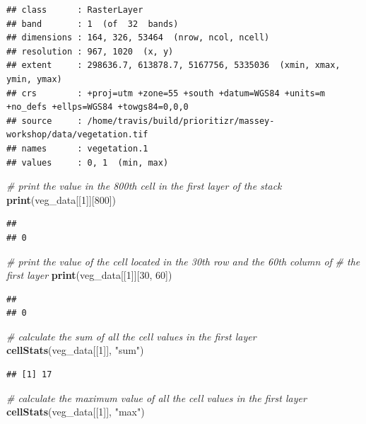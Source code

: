 \documentclass[12pt,]{book}
\newenvironment{Shaded}{\begin{snugshade}}{\end{snugshade}}
\newcommand{\KeywordTok}[1]{\textcolor[rgb]{0.13,0.29,0.53}{\textbf{#1}}}
\newcommand{\DecValTok}[1]{\textcolor[rgb]{0.00,0.00,0.81}{#1}}
\newcommand{\StringTok}[1]{\textcolor[rgb]{0.31,0.60,0.02}{#1}}
\newcommand{\CommentTok}[1]{\textcolor[rgb]{0.56,0.35,0.01}{\textit{#1}}}
\newcommand{\NormalTok}[1]{#1}
\begin{document}
\begin{verbatim}
## class      : RasterLayer 
## band       : 1  (of  32  bands)
## dimensions : 164, 326, 53464  (nrow, ncol, ncell)
## resolution : 967, 1020  (x, y)
## extent     : 298636.7, 613878.7, 5167756, 5335036  (xmin, xmax, ymin, ymax)
## crs        : +proj=utm +zone=55 +south +datum=WGS84 +units=m +no_defs +ellps=WGS84 +towgs84=0,0,0 
## source     : /home/travis/build/prioritizr/massey-workshop/data/vegetation.tif 
## names      : vegetation.1 
## values     : 0, 1  (min, max)
\end{verbatim}

\begin{Shaded}
\begin{Highlighting}[]
\CommentTok{# print the value in the 800th cell in the first layer of the stack}
\KeywordTok{print}\NormalTok{(veg_data[[}\DecValTok{1}\NormalTok{]][}\DecValTok{800}\NormalTok{])}
\end{Highlighting}
\end{Shaded}

\begin{verbatim}
##   
## 0
\end{verbatim}

\begin{Shaded}
\begin{Highlighting}[]
\CommentTok{# print the value of the cell located in the 30th row and the 60th column of}
\CommentTok{# the first layer}
\KeywordTok{print}\NormalTok{(veg_data[[}\DecValTok{1}\NormalTok{]][}\DecValTok{30}\NormalTok{, }\DecValTok{60}\NormalTok{])}
\end{Highlighting}
\end{Shaded}

\begin{verbatim}
##   
## 0
\end{verbatim}

\begin{Shaded}
\begin{Highlighting}[]
\CommentTok{# calculate the sum of all the cell values in the first layer}
\KeywordTok{cellStats}\NormalTok{(veg_data[[}\DecValTok{1}\NormalTok{]], }\StringTok{"sum"}\NormalTok{)}
\end{Highlighting}
\end{Shaded}

\begin{verbatim}
## [1] 17
\end{verbatim}

\begin{Shaded}
\begin{Highlighting}[]
\CommentTok{# calculate the maximum value of all the cell values in the first layer}
\KeywordTok{cellStats}\NormalTok{(veg_data[[}\DecValTok{1}\NormalTok{]], }\StringTok{"max"}\NormalTok{)}
\end{Highlighting}
\end{Shaded}
\end{document}
